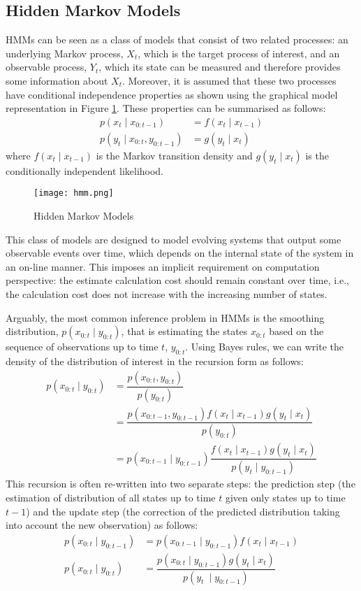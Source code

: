 \subsection{Hidden Markov Models}
HMMs can be seen as a class of models that consist of two related processes: an underlying Markov process, $X_t$, which is the target process of interest, and an observable process, $Y_t$, which its state can be measured and therefore provides some information about $X_t$. Moreover, it is assumed that these two processes have conditional independence properties as shown using the graphical model representation in Figure \ref{fig:HMM}. These properties can be summarised as follows:
\begin{align}
   p(x_t \mid x_{0:t-1}) &= f(x_t \mid x_{t-1})   \nonumber \\
   p(y_t \mid x_{0:t}, y_{0:t-1}) &= g(y_t \mid x_{t}) 
\end{align}
where $f(x_t \mid x_{t-1})$ is the Markov transition density and $g(y_t \mid x_t)$ is the conditionally independent likelihood. 

\begin{figure}[!thp]
\centering
\texttt{[image: hmm.png]} 
\caption{Hidden Markov Models}
\label{fig:HMM}
\end{figure}

This class of models are designed to model evolving systems that output some observable events over time, which depends on the internal state of the system in an on-line manner. This imposes an implicit requirement on computation perspective: the estimate calculation cost should remain constant over time, i.e., the calculation cost does not increase with the increasing number of states.

Arguably, the most common inference problem in HMMs is the smoothing distribution, $p(x_{0:t} \mid y_{0:t})$, that is estimating the states $x_{0:t}$ based on the sequence of observations up to time $t$, $y_{0:t}$. Using Bayes rules, we can write the density of the distribution of interest in the recursion form as follows:
\begin{align}
    p(x_{0:t} \mid y_{0:t}) &= \dfrac{p(x_{0:t}, y_{0:t})}{p(y_{0:t})} \nonumber \\
                            &= \dfrac{p(x_{0:t-1}, y_{0:t-1})f(x_t \mid x_{t-1}) g(y_t \mid x_t)}{p(y_{0:t})} \nonumber \\ 
                            &= p(x_{0:t-1} \mid y_{0:t-1})\dfrac{f(x_t \mid x_{t-1}) g(y_t \mid x_t)}{p(y_t \mid y_{0:t-1})} 
\end{align}
This recursion is often re-written into two separate steps: the prediction step (the estimation of distribution of all states up to time $t$ given only states up to time $t-1$) and the update step (the correction of the predicted distribution taking into account the new observation) as follows:
\begin{align}
  p(x_{0:t} \mid y_{0:t-1}) &= p(x_{0:t-1} \mid y_{0:t-1})f(x_t \mid x_{t-1}) \nonumber \\
  p(x_{0:t} \mid y_{0:t})   &= \dfrac{p(x_{0:t} \mid y_{0:t-1}) g(y_t \mid x_t)}{p(y_t\
 \mid y_{0:t-1})}
\end{align}

